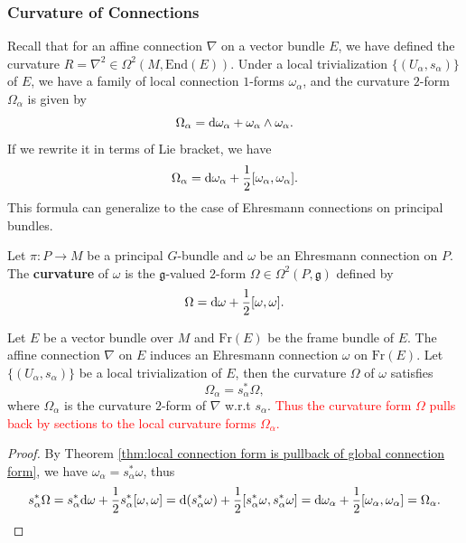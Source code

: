 \subsubsection{Curvature of Connections}
Recall that for an affine connection $\nabla$ on a vector bundle $E$, 
we have defined the curvature $R = \nabla^2\in \Omega^2(M, \mathrm{End}(E))$.
Under a local trivialization $\{(U_\alpha, s_\alpha)\}$ of $E$, 
we have a family of local connection $1$-forms $\omega_\alpha$, 
and the curvature $2$-form $\Omega_\alpha$ is given by
\begin{equation*}
    \Omega_\alpha = {\rm d}\omega_\alpha + \omega_\alpha\wedge\omega_\alpha.
\end{equation*}
If we rewrite it in terms of Lie bracket, we have
\begin{equation*}
    \Omega_\alpha = {\rm d}\omega_\alpha + \frac{1}{2}[\omega_\alpha, \omega_\alpha].
\end{equation*}
This formula can generalize to the case of Ehresmann connections on principal bundles.
\begin{definition}
    Let $\pi: P\to M$ be a principal $G$-bundle and $\omega$ be an Ehresmann connection on $P$. 
    The \textbf{curvature} of $\omega$ is the $\mathfrak{g}$-valued $2$-form $\Omega\in \Omega^2(P, \mathfrak{g})$ defined by 
    \begin{equation*}
        \Omega = {\rm d}\omega + \frac{1}{2}[\omega, \omega].
    \end{equation*}
\end{definition}
\begin{proposition}
    Let $E$ be a vector bundle over $M$ and $\mathrm{Fr}(E)$ be the frame bundle of $E$. 
    The affine connection $\nabla$ on $E$ induces an Ehresmann connection $\omega$ on $\mathrm{Fr}(E)$. 
    Let $\{(U_\alpha, s_\alpha)\}$ be a local trivialization of $E$, 
    then the curvature $\Omega$ of $\omega$ satisfies
    \begin{equation*}
        \Omega_\alpha = s_\alpha^*\Omega,
    \end{equation*}
    where $\Omega_\alpha$ is the curvature $2$-form of $\nabla$ w.r.t $s_\alpha$.
    \textcolor{red}{Thus the curvature form $\Omega$ pulls back by sections to the local curvature forms $\Omega_\alpha$.}
\end{proposition}
\begin{proof}
    By Theorem \ref{thm:local connection form is pullback of global connection form}, we have $\omega_\alpha = s_\alpha^*\omega$, thus
    \begin{equation*}
        s_\alpha^*\Omega = s_\alpha^*{\rm d}\omega + \frac{1}{2}s_\alpha^*[\omega, \omega] 
        = {\rm d}(s_\alpha^*\omega) + \frac{1}{2}[s_\alpha^*\omega, s_\alpha^*\omega] 
        = {\rm d}\omega_\alpha + \frac{1}{2}[\omega_\alpha, \omega_\alpha] 
        = \Omega_\alpha. \qedhere
    \end{equation*}
\end{proof}
